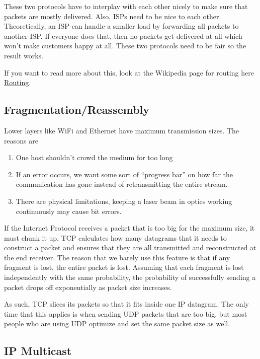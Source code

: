 These two protocols have to interplay with each other nicely to make sure that packets are mostly delivered.
Also, ISPs need to be nice to each other.
Theoretically, an ISP can handle a smaller load by forwarding all packets to another ISP.
If everyone does that, then no packets get delivered at all which won't make customers happy at all.
These two protocols need to be fair so the result works.

If you want to read more about this, look at the Wikipedia page for routing here \href{https://en.wikipedia.org/wiki/Routing}{Routing}.

\subsection{Fragmentation/Reassembly}

Lower layers like WiFi and Ethernet have maximum transmission sizes.
The reasons are

\begin{enumerate}
  \item One host shouldn't crowd the medium for too long
  \item If an error occurs, we want some sort of ``progress bar'' on how far the communication has gone instead of retransmitting the entire stream.
  \item There are physical limitations, keeping a laser beam in optics working continuously may cause bit errors.
\end{enumerate}

If the Internet Protocol receives a packet that is too big for the maximum size, it must chunk it up.
TCP calculates how many datagrams that it needs to construct a packet and ensures that they are all transmitted and reconstructed at the end receiver.
The reason that we barely use this feature is that if any fragment is lost, the entire packet is lost.
Assuming that each fragment is lost independently with the same probability, the probability of successfully sending a packet drops off exponentially as packet size increases.

As such, TCP slices its packets so that it fits inside one IP datagram.
The only time that this applies is when sending UDP packets that are too big, but most people who are using UDP optimize and set the same packet size as well.

\subsection{IP Multicast}

